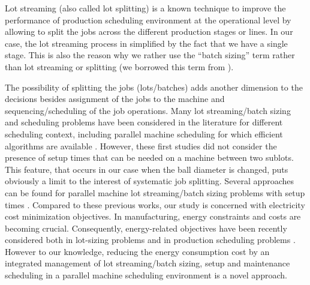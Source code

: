 Lot streaming (also called lot splitting) is a known technique to
improve the performance of production scheduling environment at the
operational level \cite{dauzere1997lot,chang2005comprehensive} by
allowing to split the jobs across the different production stages or
lines.  In our case, the lot streaming process in simplified by the
fact that we have a single stage. This is also the reason why we
rather use the ``batch sizing'' term rather than lot streaming or
splitting (we borrowed this term from \cite{Hazir2014}).

The possibility of splitting the jobs (lots/batches) adds another
dimension to the decisions besides assignment of the jobs to the
machine and sequencing/scheduling of the job operations. Many lot
streaming/batch sizing and scheduling problems have been considered in
the literature for different scheduling context, including parallel
machine scheduling for which efficient algorithms are available
\cite{serafini1996scheduling,xing2000parallel}. However, these first
studies did not consider the presence of setup times that can be
needed on a machine between two sublots. This feature, that occurs in
our case when the ball diameter is changed, puts obviously a limit to
the interest of systematic job splitting.  Several approaches can be
found for parallel machine lot streaming/batch sizing problems with
setup times
\cite{Yalaoui2003,tahar2006linear,beraldi2008rolling}. Compared to
these previous works, our study is concerned with electricity cost
minimization objectives. In manufacturing, energy constraints and
costs are becoming crucial. Consequently, energy-related objectives
have been recently considered both in lot-sizing problems
\cite{absi2013lot} and in production scheduling problems
\cite{mouzon2007operational,artigues2013energy,german2015}. However to
our knowledge, reducing the energy consumption cost by an integrated
management of lot streaming/batch sizing, setup and maintenance
scheduling in a parallel machine scheduling environment is a novel
approach.

